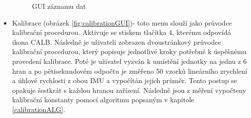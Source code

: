 \begin{itemize}
\begin{figure}[h]
        \caption{GUI záznamu dat}
        \label{fig:recordGUI}
\end{figure}

\item Kalibrace (obrázek \ref{fig:calibrationGUI})- toto menu slouží jako průvodce kalibrační procedurou. Aktivuje se stiskem tlačítka 4, kterému odpovídá ikona CALB. Následně je uživateli zobrazen dvoustránkový průvodce kalibrační procedurou, který popisuje jednotlivé kroky potřebné k úspěšnému provedení kalibrace. Poté je uživatel vyzván k umístění jednotky na jednu z 6 hran a po pětisekundovém odpočtu je změřeno 50 vzorků lineárního zrychlení a úhlové rychlosti z obou IMU a vypočítán jejich průměr. Tento postup se opakuje šestkrát s každou hranou zařízení. Následně jsou z měření vypočteny kalibrační konstanty pomocí algoritmu popsaným v kapitole \ref{calibrationALG}.
\end{itemize}
